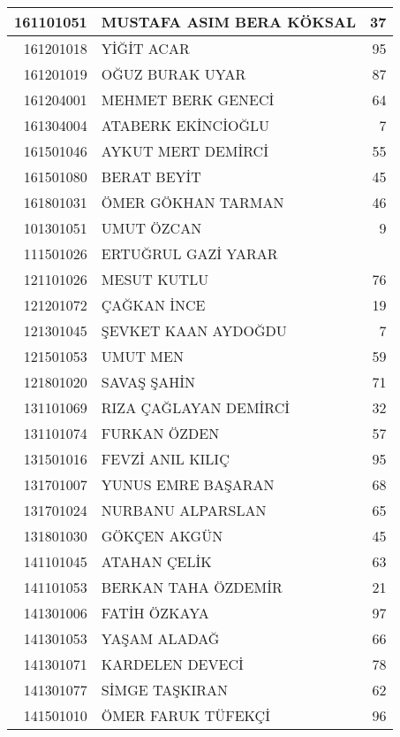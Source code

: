 \documentclass[12pt]{article}
\begin{document}
\begin{multicols}{2}
\begin{longtable}{||r||l||r||}
    \midrule
    161101051 & MUSTAFA ASIM BERA KÖKSAL & 37 \\
    \midrule
    161201018 & YİĞİT ACAR & 95 \\
    \midrule
    161201019 & OĞUZ BURAK UYAR & 87 \\
    \midrule
    161204001 & MEHMET BERK GENECİ & 64 \\
    \midrule
    161304004 & ATABERK EKİNCİOĞLU & 7 \\
    \midrule
    161501046 & AYKUT MERT DEMİRCİ & 55 \\
    \midrule
    161501080 & BERAT BEYİT & 45 \\
    \midrule
    161801031 & ÖMER GÖKHAN TARMAN & 46 \\
    \midrule
    101301051 & UMUT ÖZCAN & 9 \\
    \midrule
    111501026 & ERTUĞRUL GAZİ YARAR &  \\
    \midrule
    121101026 & MESUT KUTLU & 76 \\
    \midrule
    121201072 & ÇAĞKAN İNCE & 19 \\
    \midrule
    121301045 & ŞEVKET KAAN AYDOĞDU & 7 \\
    \midrule
    121501053 & UMUT MEN & 59 \\
    \midrule
    121801020 & SAVAŞ ŞAHİN & 71 \\
    \midrule
    131101069 & RIZA ÇAĞLAYAN DEMİRCİ & 32 \\
    \midrule
    131101074 & FURKAN ÖZDEN & 57 \\
    \midrule
    131501016 & FEVZİ ANIL KILIÇ & 95 \\
    \midrule
    131701007 & YUNUS EMRE BAŞARAN & 68 \\
    \midrule
    131701024 & NURBANU ALPARSLAN & \cellcolor[rgb]{ 1,  1,  0} 65 \\
    \midrule
    131801030 & GÖKÇEN AKGÜN & 45 \\
    \midrule
    141101045 & ATAHAN ÇELİK & 63 \\
    \midrule
    141101053 & BERKAN TAHA ÖZDEMİR & 21 \\
    \midrule
    141301006 & FATİH ÖZKAYA & 97 \\
    \midrule
    141301053 & YAŞAM ALADAĞ & 66 \\
    \midrule
    141301071 & KARDELEN DEVECİ & \cellcolor[rgb]{ 1,  1,  0} 78 \\
    \midrule
    141301077 & SİMGE TAŞKIRAN & 62 \\
    \midrule
    141501010 & ÖMER FARUK TÜFEKÇİ & 96 \\

\end{longtable}
\end{multicols}
\end{document}
